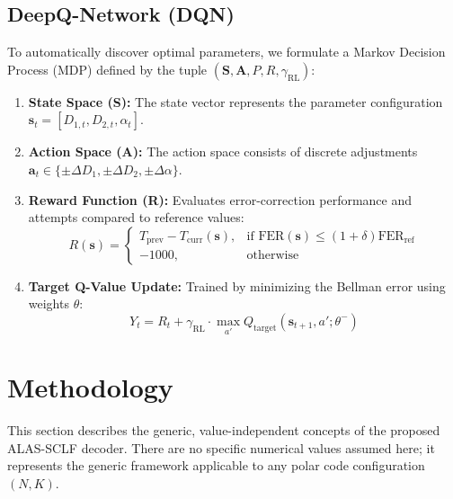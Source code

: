 \documentclass[journal,10pt,twocolumn]{IEEEtran}
\begin{document}
\subsection{DeepQ-Network (DQN)}
To automatically discover optimal parameters, we formulate a Markov Decision Process (MDP) defined by the tuple $(\mathbf{S}, \mathbf{A}, P, R, \gamma_{\text{RL}})$:
\begin{enumerate}
    \item \textbf{State Space (S):} The state vector represents the parameter configuration $\mathbf{s}_t = [D_{1, t}, D_{2, t}, \alpha_t]$.
    \item \textbf{Action Space (A):} The action space consists of discrete adjustments $\mathbf{a}_t \in \{ \pm\Delta D_1, \pm\Delta D_2, \pm\Delta\alpha \}$.
    \item \textbf{Reward Function (R):} Evaluates error-correction performance and attempts compared to reference values:
    \begin{equation}
    R(\mathbf{s}) = \begin{cases} T_{\text{prev}} - T_{\text{curr}}(\mathbf{s}), & \text{if } \text{FER}(\mathbf{s}) \le (1 + \delta) \text{FER}_{\text{ref}} \\ -1000, & \text{otherwise} \end{cases}
    \end{equation}
    \item \textbf{Target Q-Value Update:} Trained by minimizing the Bellman error using weights $\theta$:
    \begin{equation}
    Y_t = R_t + \gamma_{\text{RL}} \cdot \max_{a'} Q_{\text{target}}(\mathbf{s}_{t+1}, a'; \theta^-)
    \end{equation}
\end{enumerate}

\section{Methodology}
This section describes the generic, value-independent concepts of the proposed ALAS-SCLF decoder. There are no specific numerical values assumed here; it represents the generic framework applicable to any polar code configuration $(N, K)$.
\end{document}
